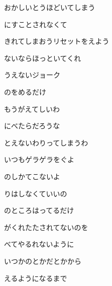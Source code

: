 \documentclass[a4paper,tate,twocolumn,12pt]{ltjtarticle}
\begin{document}
\begin{flushleft}
\vspace{2em}

\noindent\begin{minipage}{\linewidth}
おかしいとうほどいてしまう

にすことされなくて

きれてしまおうリセットをえよう

ないならほっといてくれ

うえないジョーク

のをめるだけ
\end{minipage}

\vspace{2em}

\noindent\begin{minipage}{\linewidth}
もうがえてしいわ

にべたらだろうな

とえないわりってしまうわ

いつもゲラゲラをぐよ

のしかてこないよ

りはしなくていいの

のところはってるだけ
\end{minipage}

\vspace{2em}

\noindent\begin{minipage}{\linewidth}
がくれたたされてないのを

べてやるれないように

いつかのとかだとかから

えるようになるまで
\end{minipage}


\end{flushleft}
\end{document}
